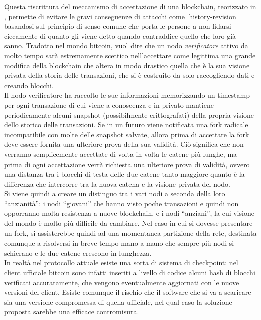 Questa riscrittura del meccanismo di accettazione di una blockchain, teorizzato in \cite{bitter-better}, permette di evitare le gravi conseguenze di attacchi come \ref{history-revision} basandosi sul principio di senso comune che porta le persone a non fidarsi ciecamente di quanto gli viene detto quando contraddice quello che loro già sanno.
Tradotto nel mondo bitcoin, vuol dire che un nodo \emph{verificatore} attivo da molto tempo sarà estremamente scettico nell'accettare come legittima una grande modifica della blockchain che altera in modo drastico quella che è la sua visione privata della storia delle transazioni, che si è costruito da solo raccogliendo dati e creando blocchi.\\
Il nodo verificatore ha raccolto le sue informazioni memorizzando un timestamp per ogni transazione di cui viene a conoscenza e in privato mantiene periodicamente alcuni snapshot (possibilmente crittografati) della propria visione dello storico delle transazioni. Se in un futuro viene notificata una fork radicale incompatibile con molte delle snapshot salvate, allora prima di accettare la fork deve essere fornita una ulteriore prova della sua validità. Ciò significa che non verranno semplicemente accettate di volta in volta le catene più lunghe, ma prima di ogni accettazione verrà richiesta una ulteriore prova di validità, ovvero una distanza tra i blocchi di testa delle due catene tanto maggiore quanto è la differenza che intercorre tra la nuova catena e la visione privata del nodo.\\
Si viene quindi a creare un distinguo tra i vari nodi a seconda della loro ``anzianità'': i nodi ``giovani'' che hanno visto poche transazioni e quindi non opporranno molta resistenza a nuove blockchain, e i nodi ``anziani'', la cui visione del mondo è molto più difficile da cambiare. Nel caso in cui si dovesse presentare un fork, si assisterebbe quindi ad una momentanea partizione della rete, destinata comunque a risolversi in breve tempo mano a mano che sempre più nodi si schierano e le due catene crescono in lunghezza.\\
In realtà nel protocollo attuale esiste una sorta di sistema di checkpoint: nel client ufficiale bitcoin sono infatti inseriti a livello di codice alcuni hash di blocchi verificati accuratamente, che vengono eventualmente aggiornati con le nuove versioni del client. Esiste comunque il rischio che il software che si va a scaricare sia una versione compromessa di quella ufficiale, nel qual caso la soluzione proposta sarebbe una efficace contromisura.

